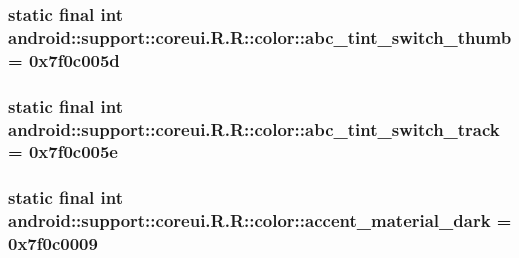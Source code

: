 \hypertarget{classandroid_1_1support_1_1coreui_1_1_r_1_1color_31a05d458e13b8a0945b82fcae757ab7}{
\subsubsection[{abc\_\-tint\_\-switch\_\-thumb}]{\setlength{\rightskip}{0pt plus 5cm}static final int android::support::coreui.R.R::color::abc\_\-tint\_\-switch\_\-thumb = 0x7f0c005d}}
\label{classandroid_1_1support_1_1coreui_1_1_r_1_1color_31a05d458e13b8a0945b82fcae757ab7}


\hypertarget{classandroid_1_1support_1_1coreui_1_1_r_1_1color_24424fa8a39421117bd66886140ca7b7}{
\subsubsection[{abc\_\-tint\_\-switch\_\-track}]{\setlength{\rightskip}{0pt plus 5cm}static final int android::support::coreui.R.R::color::abc\_\-tint\_\-switch\_\-track = 0x7f0c005e}}
\label{classandroid_1_1support_1_1coreui_1_1_r_1_1color_24424fa8a39421117bd66886140ca7b7}


\hypertarget{classandroid_1_1support_1_1coreui_1_1_r_1_1color_6470df3d34336d3f12f644f1796d26eb}{
\subsubsection[{accent\_\-material\_\-dark}]{\setlength{\rightskip}{0pt plus 5cm}static final int android::support::coreui.R.R::color::accent\_\-material\_\-dark = 0x7f0c0009}}
\label{classandroid_1_1support_1_1coreui_1_1_r_1_1color_6470df3d34336d3f12f644f1796d26eb}


